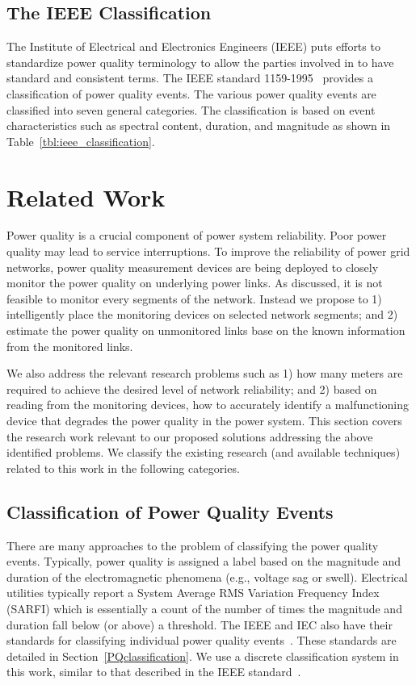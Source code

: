\subsection{The IEEE Classification}
The Institute of Electrical and Electronics Engineers (IEEE) puts efforts to standardize power quality terminology to allow the parties involved in to have standard and consistent terms. The IEEE standard 1159-1995~\cite{IEEE09_1159} provides a classification of power quality events. The various power quality events are classified into seven general categories. The classification is based on event characteristics such as spectral content, duration, and magnitude as shown in Table~\ref{tbl:ieee_classification}.

\section{Related Work}
\label{sec:related_work}
Power quality is a crucial component of power system reliability. Poor power quality may lead to service interruptions. To improve the reliability of power grid networks, power quality measurement devices are being deployed to closely monitor the  power quality on underlying power links. As discussed, it is not feasible to monitor every segments of the network. Instead we propose to 1) intelligently place the monitoring devices on selected network segments; and 2) estimate the power quality on unmonitored links base on the known information from the monitored links.

We also address the relevant research problems such as 1) how many meters are required to achieve the desired level of network reliability; and 2) based on reading from the monitoring devices, how to accurately identify a malfunctioning device that degrades the power quality in the power system. This section covers the research work relevant to our proposed solutions addressing the above identified problems. We classify the existing research (and available techniques) related to this work in the following categories.

\subsection{Classification of Power Quality Events}
There are many approaches to the problem of classifying the power quality events. Typically, power quality is assigned a label based on the magnitude and duration of the electromagnetic phenomena (e.g., voltage sag or swell). Electrical utilities typically report a System Average RMS Variation Frequency Index (SARFI) which is essentially a count of the number of times the magnitude and duration fall below (or above) a threshold. The IEEE and IEC also have their standards for classifying individual power quality events~\cite{iec_61000, IEEE09_1159}. These standards are detailed in Section~\ref{PQclassification}. We use a discrete classification system in this work, similar to that described in the IEEE standard~\cite{IEEE09_1159}.


